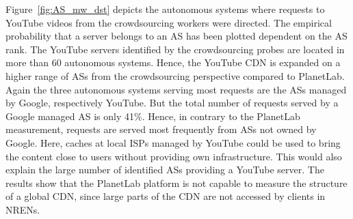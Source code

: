 
Figure~\ref{fig:AS_mw_dst} depicts the autonomous systems where requests to YouTube videos from  the crowdsourcing workers were directed.
The empirical probability that a server belongs to an AS has been plotted dependent on the AS rank.
The YouTube servers identified by the crowdsourcing probes are located in more than 60 autonomous systems.
Hence, the YouTube CDN is expanded on a higher range of ASs from the crowdsourcing perspective compared to PlanetLab.
Again the three autonomous systems serving most requests are the ASs managed by Google, respectively YouTube.
But the total number of requests served by a Google managed AS is only 41\%.
Hence, in contrary to the PlanetLab measurement, requests are served most frequently from ASs not owned by Google.
Here, caches at local ISPs  managed by YouTube could be used to bring the content close to users without providing own infrastructure.
This would also explain the large number of identified ASs providing a YouTube server.
The results show that the PlanetLab platform is not capable to measure the structure of a global CDN, since large parts of the CDN are not accessed by clients in NRENs.




